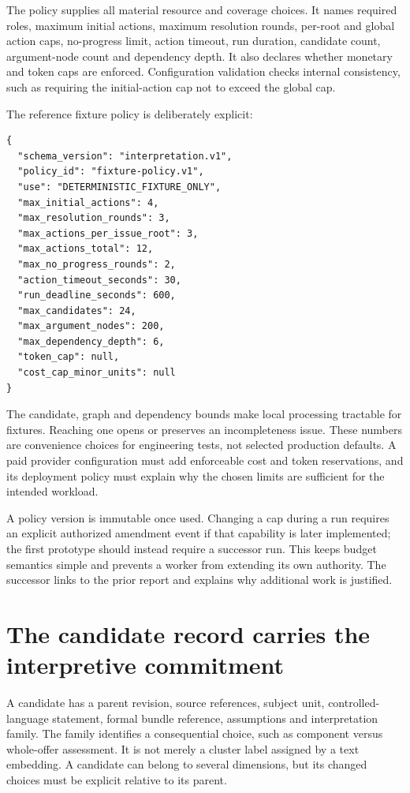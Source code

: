 The policy supplies all material resource and coverage choices. It names required
roles, maximum initial actions, maximum resolution rounds, per-root and global
action caps, no-progress limit, action timeout, run duration, candidate count,
argument-node count and dependency depth. It also declares whether monetary and
token caps are enforced. Configuration validation checks internal consistency,
such as requiring the initial-action cap not to exceed the global cap.

The reference fixture policy is deliberately explicit:
\begin{lstlisting}[caption={Reference limits for deterministic controller fixtures.}]
{
  "schema_version": "interpretation.v1",
  "policy_id": "fixture-policy.v1",
  "use": "DETERMINISTIC_FIXTURE_ONLY",
  "max_initial_actions": 4,
  "max_resolution_rounds": 3,
  "max_actions_per_issue_root": 3,
  "max_actions_total": 12,
  "max_no_progress_rounds": 2,
  "action_timeout_seconds": 30,
  "run_deadline_seconds": 600,
  "max_candidates": 24,
  "max_argument_nodes": 200,
  "max_dependency_depth": 6,
  "token_cap": null,
  "cost_cap_minor_units": null
}
\end{lstlisting}

The candidate, graph and dependency bounds make local processing tractable for
fixtures. Reaching one opens or preserves an incompleteness issue. These numbers
are convenience choices for engineering tests, not selected production defaults.
A paid provider configuration must add enforceable cost and token reservations,
and its deployment policy must explain why the chosen limits are sufficient for
the intended workload.

A policy version is immutable once used. Changing a cap during a run requires an
explicit authorized amendment event if that capability is later implemented;
the first prototype should instead require a successor run. This keeps budget
semantics simple and prevents a worker from extending its own authority. The
successor links to the prior report and explains why additional work is justified.

\section{The candidate record carries the interpretive commitment}
\label{merge:M08:03}


A candidate has a parent revision, source references, subject unit, controlled-
language statement, formal bundle reference, assumptions and interpretation
family. The family identifies a consequential choice, such as component versus
whole-offer assessment. It is not merely a cluster label assigned by a text
embedding. A candidate can belong to several dimensions, but its changed choices
must be explicit relative to its parent.

